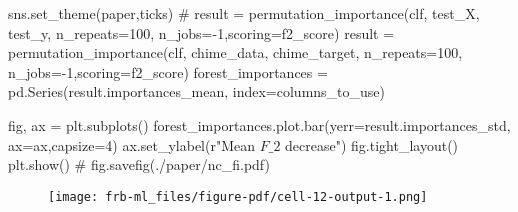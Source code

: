 \documentclass[
  letterpaper,
  DIV=11,
  numbers=noendperiod]{scrartcl}
\newenvironment{Shaded}{\begin{snugshade}}{\end{snugshade}}
\newcommand{\CommentTok}[1]{\textcolor[rgb]{0.37,0.37,0.37}{#1}}
\newcommand{\DecValTok}[1]{\textcolor[rgb]{0.68,0.00,0.00}{#1}}
\newcommand{\NormalTok}[1]{\textcolor[rgb]{0.00,0.23,0.31}{#1}}
\newcommand{\OperatorTok}[1]{\textcolor[rgb]{0.37,0.37,0.37}{#1}}
\newcommand{\StringTok}[1]{\textcolor[rgb]{0.13,0.47,0.30}{#1}}
\newcommand{\VerbatimStringTok}[1]{\textcolor[rgb]{0.13,0.47,0.30}{#1}}
\begin{document}
\begin{Shaded}
\begin{Highlighting}[]
\NormalTok{sns.set\_theme(}\StringTok{\textquotesingle{}paper\textquotesingle{}}\NormalTok{,}\StringTok{\textquotesingle{}ticks\textquotesingle{}}\NormalTok{)}
\CommentTok{\# result = permutation\_importance(clf, test\_X, test\_y, n\_repeats=100, n\_jobs={-}1,scoring=f2\_score)}
\NormalTok{result }\OperatorTok{=}\NormalTok{ permutation\_importance(clf, chime\_data, chime\_target, n\_repeats}\OperatorTok{=}\DecValTok{100}\NormalTok{, n\_jobs}\OperatorTok{={-}}\DecValTok{1}\NormalTok{,scoring}\OperatorTok{=}\NormalTok{f2\_score)}
\NormalTok{forest\_importances }\OperatorTok{=}\NormalTok{ pd.Series(result.importances\_mean, index}\OperatorTok{=}\NormalTok{columns\_to\_use)}

\NormalTok{fig, ax }\OperatorTok{=}\NormalTok{ plt.subplots()}
\NormalTok{forest\_importances.plot.bar(yerr}\OperatorTok{=}\NormalTok{result.importances\_std, ax}\OperatorTok{=}\NormalTok{ax,capsize}\OperatorTok{=}\DecValTok{4}\NormalTok{)}
\NormalTok{ax.set\_ylabel(}\VerbatimStringTok{r"Mean $F\_2$ decrease"}\NormalTok{)}
\NormalTok{fig.tight\_layout()}
\NormalTok{plt.show()}
\CommentTok{\# fig.savefig(\textquotesingle{}./paper/nc\_fi.pdf\textquotesingle{})}
\end{Highlighting}
\end{Shaded}

\begin{figure}[H]

{\centering \texttt{[image: frb-ml\_files/figure-pdf/cell-12-output-1.png]}

}

\end{figure}
\end{document}
